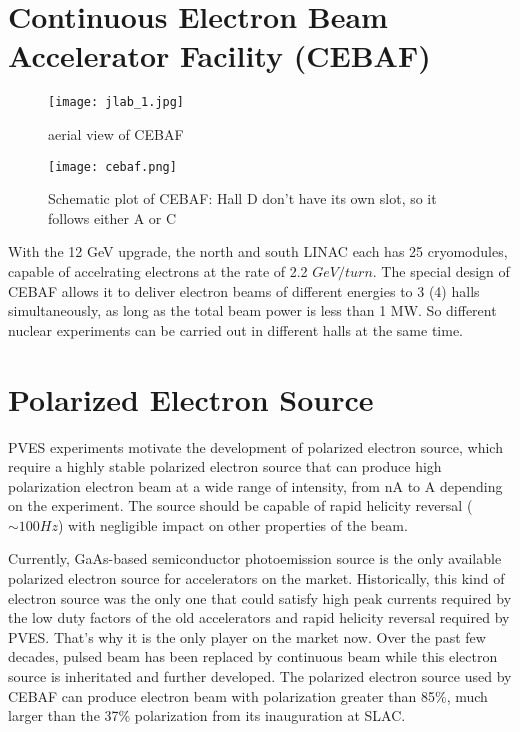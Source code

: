 \section{Continuous Electron Beam Accelerator Facility (CEBAF)}
\begin{figure}[h!]
    \texttt{[image: jlab\_1.jpg]}
    \caption{aerial view of CEBAF} 
\end{figure}
\begin{figure}[h!]
    \texttt{[image: cebaf.png]}
    \caption{Schematic plot of CEBAF: Hall D don't have its own slot, so it 
    follows either A or C} 
\end{figure}
With the 12 GeV upgrade, the north and south LINAC each has 25 cryomodules, 
capable of accelrating electrons at the rate of 2.2 $GeV/turn$. The special
design of CEBAF allows it to deliver electron beams of different energies to
3 (4) halls simultaneously, as long as the total beam power is less than 1 MW.
So different nuclear experiments can be carried out in different halls at the 
same time.

\section{Polarized Electron Source}
PVES experiments motivate the development of polarized electron source, which 
require a highly stable polarized electron source that can produce
high polarization electron beam at a wide range of intensity, from nA to A 
depending on the experiment. The source should be capable of rapid helicity
reversal ($\sim 100 Hz$) with negligible impact on other properties of the beam.

Currently, GaAs-based semiconductor photoemission source is %
the only available polarized electron source for accelerators on the market.
Historically, this 
kind of electron source was the only one that could satisfy high peak currents 
required by the low duty factors of the old accelerators and rapid helicity 
reversal required by PVES. That's why it is the only player on the market now.
Over the past few decades, pulsed beam has been replaced by continuous beam while
this electron source is inheritated and further developed. The polarized electron
source used by CEBAF can produce electron beam with polarization greater than
85\%, much larger than the 37\% polarization from its inauguration at SLAC. \cite{PRESCOTT1978347}

